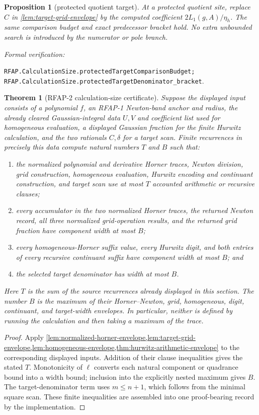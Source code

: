 \documentclass[11pt]{article}
\newtheorem{theorem}{Theorem}[section]
\newtheorem{proposition}[proposition]{Proposition}
\newcommand{\leanref}[1]{\par\smallskip\noindent
  \emph{Formal verification:}\par\nobreak
  {\raggedright\nolinkurl{#1}.\par}}
\begin{document}
\begin{proposition}[protected quotient target]
\label{prop:protected-target-envelope}
At a protected quotient site, replace $C$ in
\cref{lem:target-grid-envelope} by the computed coefficient
$2L_1(g,A)/\eta_h$.  The same comparison budget and exact predecessor bracket
hold.  No extra unbounded search is introduced by the numerator or pole
branch.
\end{proposition}

\leanref{RFAP.CalculationSize.protectedTargetComparisonBudget;
RFAP.CalculationSize.protectedTargetDenominator_bracket}

\begin{theorem}[RFAP-2 calculation-size certificate]
\label{thm:stage-two-resource-certificate}
Suppose the displayed input consists of a polynomial $f$, an RFAP-1
Newton-band anchor and radius, the already cleared Gaussian-integral data
$U,V$ and coefficient list used for homogeneous evaluation, a displayed
Gaussian fraction for the finite Hurwitz calculation, and the two rationals
$C,\delta$ for a target scan.  Finite recurrences in precisely this data
compute natural numbers $T$ and $B$ such that:
\begin{enumerate}
\item the normalized polynomial and derivative Horner traces, Newton
  division, grid construction, homogeneous evaluation, Hurwitz encoding and
  continuant construction, and target scan use at most $T$ accounted
  arithmetic or recursive clauses;
\item every accumulator in the two normalized Horner traces, the returned
  Newton record, all three normalized grid-operation results, and the returned
  grid fraction have component width at most $B$;
\item every homogeneous-Horner suffix value, every Hurwitz digit, and both
  entries of every recursive continuant suffix have component width at most
  $B$; and
\item the selected target denominator has width at most $B$.
\end{enumerate}
Here $T$ is the sum of the source recurrences already displayed in this
section.  The number $B$ is the maximum of their Horner--Newton, grid,
homogeneous, digit, continuant, and target-width envelopes.  In particular,
neither is defined by running the calculation and then taking a maximum of
the trace.
\end{theorem}

\begin{proof}
Apply
\cref{lem:normalized-horner-envelope,lem:target-grid-envelope,lem:homogeneous-envelope,thm:hurwitz-arithmetic-envelope}
to the corresponding
displayed inputs.  Addition of their clause inequalities gives the stated
$T$.  Monotonicity of $\ell$ converts each natural component or quadrance
bound into a width bound; inclusion into the explicitly nested maximum gives
$B$.  The target-denominator term uses $m\le n+1$, which follows from the
minimal square scan.  These finite inequalities are assembled into one
proof-bearing record by the implementation.
\end{proof}
\end{document}
